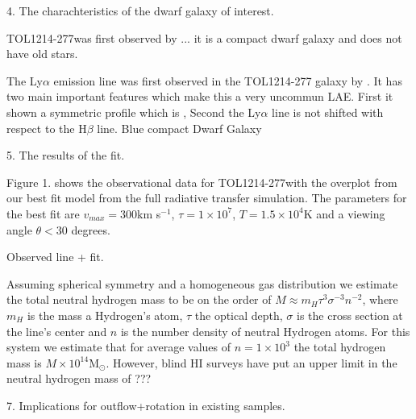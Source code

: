 \documentclass[a4paper, usenatbib, 12pt]{article}
\newcommand{\tol}{TOL1214-277}
\newcommand{\kms}{km s$^{-1}$}
\begin{document}
{%

4. The charachteristics of the dwarf galaxy of interest.

\tol was first observed by ... it is a compact 
dwarf galaxy and does not have old stars. 

The Ly$\alpha$ emission line was first observed in the TOL1214-277 
galaxy by \cite{Thuan97}. It has two main important features which 
make this a very uncommun LAE. First it shown a symmetric profile 
which is , Second the Ly$\alpha$ line is not shifted with respect to 
the H$\beta$ line.  Blue compact Dwarf Galaxy


5. The results of the fit. 

Figure 1. shows the observational data for \tol with the overplot from
our best fit model from the full radiative transfer simulation. 
The parameters for the best fit are
$v_{max}=300$\kms, $\tau=1\times10^7$, $T=1.5\times 10^{4}$K and a
viewing angle $\theta<30$ degrees. 


Observed line + fit. 


Assuming spherical symmetry and a homogeneous gas distribution we
estimate the total neutral hydrogen mass to be on the order of
$M\approx m_H\tau^3\sigma^{-3}n^{-2}$, where $m_H$ is the mass a
Hydrogen's atom, $\tau$  the optical depth, $\sigma$ is the cross
section at the line's center and $n$ is the number density of neutral
Hydrogen atoms. 
For this system we estimate that for average values of $n=1\times
10^3$ the total hydrogen mass is $M\times 10^{14}$M$_{\odot}$. 
However, blind HI
surveys have put an upper limit in the neutral hydrogen mass of ???


7. Implications for outflow+rotation in existing samples.






{}


\newpage
\begin{table}
\begin{center}


\end{center}
\end{table}}
\end{document}
